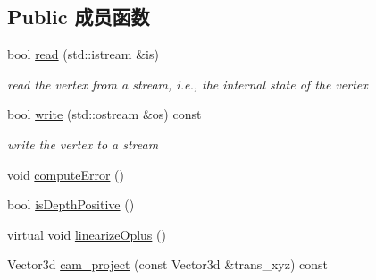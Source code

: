 \subsection*{Public 成员函数}
\begin{DoxyCompactItemize}
\item 
\hypertarget{classg2o_1_1EdgeStereoSE3ProjectXYZOnlyPose_ae199c5428259a7d50e9897029ae9fd70}{bool \hyperlink{classg2o_1_1EdgeStereoSE3ProjectXYZOnlyPose_ae199c5428259a7d50e9897029ae9fd70}{read} (std\-::istream \&is)}\label{classg2o_1_1EdgeStereoSE3ProjectXYZOnlyPose_ae199c5428259a7d50e9897029ae9fd70}

\begin{DoxyCompactList}\small\item\em read the vertex from a stream, i.\-e., the internal state of the vertex \end{DoxyCompactList}\item 
\hypertarget{classg2o_1_1EdgeStereoSE3ProjectXYZOnlyPose_aa31f6c66016ec7f362ab3028a53e8cc6}{bool \hyperlink{classg2o_1_1EdgeStereoSE3ProjectXYZOnlyPose_aa31f6c66016ec7f362ab3028a53e8cc6}{write} (std\-::ostream \&os) const }\label{classg2o_1_1EdgeStereoSE3ProjectXYZOnlyPose_aa31f6c66016ec7f362ab3028a53e8cc6}

\begin{DoxyCompactList}\small\item\em write the vertex to a stream \end{DoxyCompactList}\item 
void \hyperlink{classg2o_1_1EdgeStereoSE3ProjectXYZOnlyPose_af6fd2fdbdc9b4a6bcf21303ff3b8ea83}{compute\-Error} ()
\item 
bool \hyperlink{classg2o_1_1EdgeStereoSE3ProjectXYZOnlyPose_a5155075418c27ce8a1387d739ccbdf26}{is\-Depth\-Positive} ()
\item 
virtual void \hyperlink{classg2o_1_1EdgeStereoSE3ProjectXYZOnlyPose_a0b2b815e8ae331276f33be374dcc1897}{linearize\-Oplus} ()
\item 
Vector3d \hyperlink{classg2o_1_1EdgeStereoSE3ProjectXYZOnlyPose_acea8d0b81ed369bb63cd2f318512406f}{cam\-\_\-project} (const Vector3d \&trans\-\_\-xyz) const 
\end{DoxyCompactItemize}
